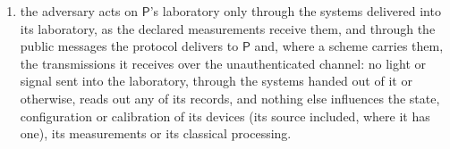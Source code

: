 \begin{assumption}
\begin{enumerate}[label=(\roman*),leftmargin=2.2em]
neither the timing of its messages nor any auxiliary or synchronisation
signal does;
\item the adversary acts on $\mathsf P$'s laboratory only through the systems
delivered into its laboratory, as the declared measurements receive them, and
through the public messages the protocol delivers to $\mathsf P$ and, where a
scheme carries them, the transmissions it receives over the unauthenticated
channel: no light or signal sent into the laboratory, through the systems
handed out of it or otherwise, reads out any of its records, and nothing else
influences the state, configuration or calibration of its devices (its source
included, where it has one), its measurements or its classical processing.
\end{enumerate}
\end{assumption}
